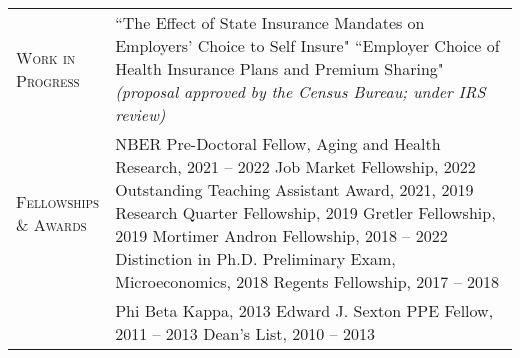 \documentclass[11pt]{article}
\begin{document}
\begin{tabularx}{\textwidth}{@{}Y Z@{}}
    \textsc{Work in \newline Progress} \vspace{20pt} & 
    ``The Effect of State Insurance Mandates on Employers' Choice to Self Insure"
     \vspace{15pt} \newline
    ``Employer Choice of Health Insurance Plans and Premium Sharing" \newline
    \textit{(proposal approved by the Census Bureau; under IRS review)} 
    \\[20pt]

	\textsc{Fellowships \newline \& Awards} \vspace{20pt} & 
	\underline{}
	\vspace{3pt} \newline
	NBER Pre-Doctoral Fellow, Aging and Health Research, 2021 -- 2022
	\vspace{15pt} \newline
	\underline{}
	\vspace{3pt} \newline
	Job Market Fellowship, 2022
	\vspace{3pt} \newline
	Outstanding Teaching Assistant Award, 2021, 2019
	\vspace{3pt} \newline
	Research Quarter Fellowship, 2019
	\vspace{3pt} \newline
	Gretler Fellowship, 2019
	\vspace{3pt} \newline
	Mortimer Andron Fellowship, 2018 -- 2022
	\vspace{3pt} \newline 
	Distinction in Ph.D. Preliminary Exam, Microeconomics, 2018
	\vspace{3pt} \newline
	Regents Fellowship, 2017 -- 2018
	\\ \newpage &
	\underline{}
	\vspace{3pt} \newline
	Phi Beta Kappa, 2013
	\vspace{3pt} \newline
	Edward J. Sexton PPE Fellow, 2011 -- 2013
	\vspace{3pt} \newline
	Dean's List, 2010 -- 2013
	\\[20pt]
	


\end{tabularx}
\end{document}
